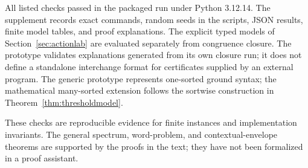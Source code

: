 All listed checks passed in the packaged run under Python 3.12.14. The supplement records exact commands, random seeds in the scripts, JSON results, finite model tables, and proof explanations. The explicit typed models of Section~\ref{sec:actionlab} are evaluated separately from congruence closure. The prototype validates explanations generated from its own closure run; it does not define a standalone interchange format for certificates supplied by an external program. The generic prototype represents one-sorted ground syntax; the mathematical many-sorted extension follows the sortwise construction in Theorem~\ref{thm:thresholdmodel}.

These checks are reproducible evidence for finite instances and implementation invariants. The general spectrum, word-problem, and contextual-envelope theorems are supported by the proofs in the text; they have not been formalized in a proof assistant.
